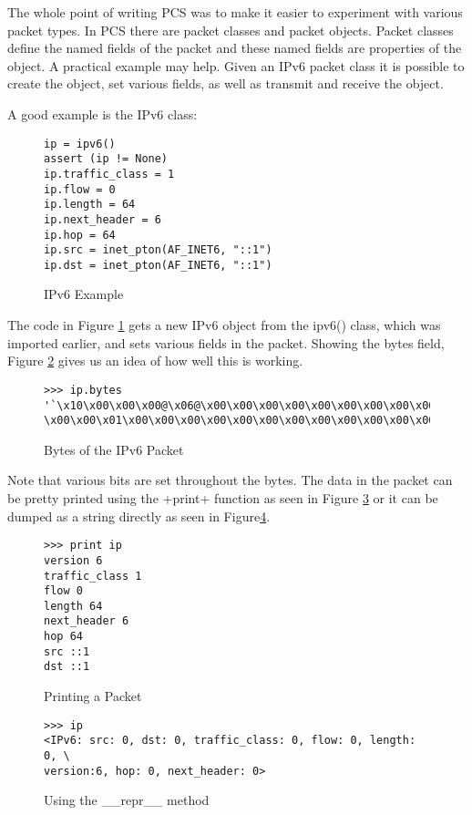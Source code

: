 \documentclass[11pt]{article}
\begin{document}
The whole point of writing PCS was to make it easier to experiment
with various packet types.  In PCS there are packet classes and packet
objects.  Packet classes define the named fields of the packet and
these named fields are properties of the object.  A practical example
may help.  Given an IPv6 packet class it is possible to create the
object, set various fields, as well as transmit and receive the
object.

A good example is the IPv6 class:
\begin{figure}
  \centering
\begin{lstlisting}
ip = ipv6()
assert (ip != None)
ip.traffic_class = 1
ip.flow = 0
ip.length = 64
ip.next_header = 6
ip.hop = 64
ip.src = inet_pton(AF_INET6, "::1")
ip.dst = inet_pton(AF_INET6, "::1")
\end{lstlisting}
  \caption{IPv6 Example}
  \label{fig:ipv6-example}
\end{figure}
The code in Figure \ref{fig:ipv6-example} gets a new IPv6 object from
the ipv6() class, which was imported earlier, and sets various fields
in the packet.  Showing the bytes field, Figure
\ref{fig:bytes-ipv6-packet} gives us an idea of how well this is
working.

\begin{figure}
  \centering
\begin{Verbatim}
>>> ip.bytes
'`\x10\x00\x00\x00@\x06@\x00\x00\x00\x00\x00\x00\x00\x00\x00\x00\x00\x00\x00
\x00\x00\x01\x00\x00\x00\x00\x00\x00\x00\x00\x00\x00\x00\x00\x00\x00\x00\x01'
\end{Verbatim}
  \caption{Bytes of the IPv6 Packet}
  \label{fig:bytes-ipv6-packet}
\end{figure}

Note that various bits are set throughout the bytes.  The data in the
packet can be pretty printed using the \function+print+ function as
seen in Figure \ref{fig:printing-a-packet} or it can be dumped as a
string directly as seen in Figure\ref{fig:repr-method}.

\begin{figure}
  \centering
\begin{lstlisting}
>>> print ip
version 6
traffic_class 1
flow 0
length 64
next_header 6
hop 64
src ::1
dst ::1
\end{lstlisting}
  \caption{Printing a Packet}
  \label{fig:printing-a-packet}
\end{figure}

\begin{figure}[h]
  \centering
  \begin{Verbatim}
>>> ip
<IPv6: src: 0, dst: 0, traffic_class: 0, flow: 0, length: 0, \
version:6, hop: 0, next_header: 0>
\end{Verbatim}
    \caption{Using the \_\_repr\_\_ method}
    \label{fig:repr-method}
  \end{figure}
\end{document}
